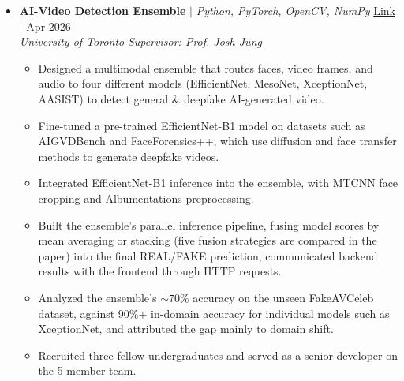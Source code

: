 \documentclass{article}
\begin{document}
\begin{itemize}
  \item[] \textbf{AI-Video Detection Ensemble} $\mid$ \textit{Python, PyTorch, OpenCV, NumPy} \hfill \href{https://github.com/gdgutm/AI-Video-Detection}{Link} $\mid$ Apr 2026 \\
  \textit{University of Toronto} \hfill \textit{Supervisor: Prof. Josh Jung}
  \vspace{-5px}
  \begin{itemize}
    \item Designed a multimodal ensemble that routes faces, video frames, and audio to four different models (EfficientNet, MesoNet, XceptionNet, AASIST) to detect general \& deepfake AI-generated video.
    \item Fine-tuned a pre-trained EfficientNet-B1 model on datasets such as AIGVDBench and FaceForensics++, which use diffusion and face transfer methods to generate deepfake videos.
    \item Integrated EfficientNet-B1 inference into the ensemble, with MTCNN face cropping and Albumentations preprocessing.
    \item Built the ensemble's parallel inference pipeline, fusing model scores by mean averaging or stacking (five fusion strategies are compared in the paper) into the final REAL/FAKE prediction; communicated backend results with the frontend through HTTP requests.
    \item Analyzed the ensemble's ${\sim}70\%$ accuracy on the unseen FakeAVCeleb dataset, against 90\%+ in-domain accuracy for individual models such as XceptionNet, and attributed the gap mainly to domain shift.
    \item Recruited three fellow undergraduates and served as a senior developer on the 5-member team.
  \end{itemize}
\end{itemize}

\end{document}
